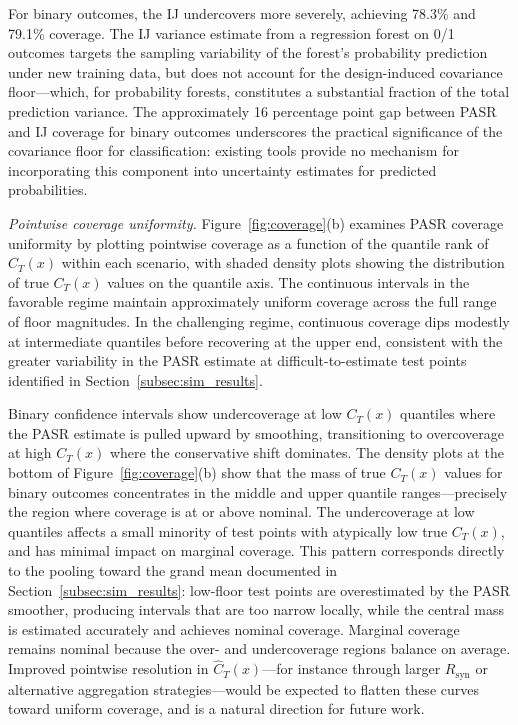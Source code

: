 \documentclass[11pt]{article}
\theoremstyle{plain}
\theoremstyle{definition}
\theoremstyle{remark}
\begin{document}
For binary outcomes, the IJ undercovers more severely, achieving 78.3\% and 79.1\% coverage. The IJ variance estimate from a regression forest on 0/1 outcomes targets the sampling variability of the forest's probability prediction under new training data, but does not account for the design-induced covariance floor---which, for probability forests, constitutes a substantial fraction of the total prediction variance. The approximately 16 percentage point gap between PASR and IJ coverage for binary outcomes underscores the practical significance of the covariance floor for classification: existing tools provide no mechanism for incorporating this component into uncertainty estimates for predicted probabilities.

\medskip
\noindent\textit{Pointwise coverage uniformity.}\quad
Figure~\ref{fig:coverage}(b) examines PASR coverage uniformity by plotting pointwise coverage as a function of the quantile rank of $C_T(x)$ within each scenario, with shaded density plots showing the distribution of true $C_T(x)$ values on the quantile axis. The continuous intervals in the favorable regime maintain approximately uniform coverage across the full range of floor magnitudes. In the challenging regime, continuous coverage dips modestly at intermediate quantiles before recovering at the upper end, consistent with the greater variability in the PASR estimate at difficult-to-estimate test points identified in Section~\ref{subsec:sim_results}.

Binary confidence intervals show undercoverage at low $C_T(x)$ quantiles where the PASR estimate is pulled upward by smoothing, transitioning to overcoverage at high $C_T(x)$ where the conservative shift dominates. The density plots at the bottom of Figure~\ref{fig:coverage}(b) show that the mass of true $C_T(x)$ values for binary outcomes concentrates in the middle and upper quantile ranges---precisely the region where coverage is at or above nominal. The undercoverage at low quantiles affects a small minority of test points with atypically low true $C_T(x)$, and has minimal impact on marginal coverage. This pattern corresponds directly to the pooling toward the grand mean documented in Section~\ref{subsec:sim_results}: low-floor test points are overestimated by the PASR smoother, producing intervals that are too narrow locally, while the central mass is estimated accurately and achieves nominal coverage. Marginal coverage remains nominal because the over- and undercoverage regions balance on average. Improved pointwise resolution in $\widehat C_T(x)$---for instance through larger $R_{\mathrm{syn}}$ or alternative aggregation strategies---would be expected to flatten these curves toward uniform coverage, and is a natural direction for future work.
\end{document}
